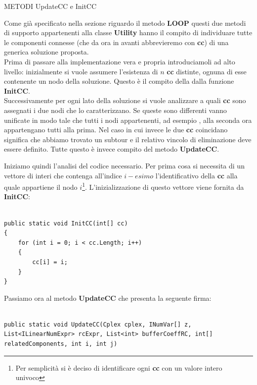 \documentclass[11pt]{article}
\begin{document}
\vspace{2\baselineskip}
METODI UpdateCC e InitCC
\vspace{2\baselineskip}

Come già specificato nella sezione riguardo il metodo \textbf{LOOP} questi due metodi di supporto appartenenti alla classe \textbf{Utility} hanno il compito di individuare tutte le componenti connesse (che da ora in avanti abbrevieremo con \textbf{cc}) di una generica soluzione proposta.\\
Prima di passare alla implementazione vera e propria introduciamoli ad alto livello: inizialmente si vuole assumere l'esistenza di $n$ \textbf{cc} distinte, ognuna di esse contenente un nodo della soluzione. Questo è il compito della dalla funzione \textbf{InitCC}.\\
Successivamente per ogni lato della soluzione si vuole analizzare a quali \textbf{cc} sono assegnati i due nodi che lo caratterizzano. Se queste sono differenti vanno unificate in modo tale che tutti i nodi appartenenti, ad esempio
, alla seconda ora appartengano tutti alla prima. Nel caso in cui invece le due \textbf{cc} coincidano significa che abbiamo trovato un subtour e il relativo vincolo di eliminazione deve essere definito. Tutte questo è invece compito del metodo \textbf{UpdateCC}.

Iniziamo quindi l'analisi del codice necessario. Per prima cosa si necessita di un vettore di interi che contenga all'indice $i-esimo$ l'identificativo della \textbf{cc} alla quale appartiene il nodo $i$\footnote{Per semplicità si è deciso di identificare ogni \textbf{cc} con un valore intero univoco}. L'inizializzazione di questo vettore viene fornita da \textbf{InitCC}:

\begin{lstlisting}

public static void InitCC(int[] cc)
{
    for (int i = 0; i < cc.Length; i++)
    {
        cc[i] = i;
    }
}

\end{lstlisting}

Passiamo ora al metodo \textbf{UpdateCC} che presenta la seguente firma:

\begin{lstlisting}

public static void UpdateCC(Cplex cplex, INumVar[] z, List<ILinearNumExpr> rcExpr, List<int> bufferCoeffRC, int[] relatedComponents, int i, int j)

\end{lstlisting}
\end{document}
